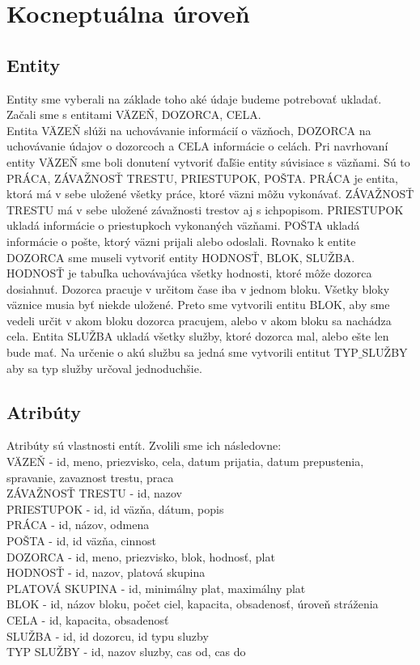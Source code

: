\documentclass[slovak, 12pt, Times New Roman]{article}
\begin{document}
	\section{Kocneptuálna úroveň}
		\subsection{Entity}
			Entity sme vyberali na základe toho aké údaje budeme potrebovať ukladať. Začali sme s entitami VÄZEŇ, DOZORCA, CELA.\\ Entita VÄZEŇ 
			slúži na uchovávanie informácií o väzňoch, DOZORCA na uchovávanie údajov o dozorcoch a CELA informácie o celách. Pri navrhovaní 
			entity VÄZEŇ sme boli donutení vytvoriť ďaľšie entity súvisiace s väzňami. Sú to PRÁCA, ZÁVAŽNOSŤ TRESTU, PRIESTUPOK, POŠTA. PRÁCA 
			je entita, ktorá má v sebe uložené všetky práce, ktoré väzni môžu vykonávať. ZÁVAŽNOSŤ TRESTU má v sebe uložené závažnosti trestov 
			aj s ichpopisom. PRIESTUPOK ukladá informácie o priestupkoch vykonaných väzňami. POŠTA ukladá informácie o pošte, ktorý väzni 
			prijali alebo odoslali. Rovnako k entite DOZORCA sme museli vytvoriť entity HODNOSŤ, BLOK, SLUŽBA. HODNOSŤ je tabuľka uchovávajúca 
			všetky hodnosti, ktoré môže dozorca dosiahnuť. Dozorca pracuje v určitom čase iba v jednom bloku. Všetky bloky väznice musia byť 
			niekde uložené. Preto sme vytvorili entitu BLOK, aby sme vedeli určit v akom bloku dozorca pracujem, alebo v akom bloku sa nachádza 
			cela. Entita SLUŽBA ukladá všetky služby, ktoré dozorca mal, alebo ešte len bude mať. Na určenie o akú službu sa jedná sme 
			vytvorili entitut TYP$\_$SLUŽBY aby sa typ služby určoval jednoduchšie.
		\subsection{Atribúty}
			Atribúty sú vlastnosti entít. Zvolili sme ich následovne: \\
			VÄZEŇ - id, meno, priezvisko, cela, datum prijatia, datum prepustenia, spravanie, zavaznost trestu, praca\\
			ZÁVAŽNOSŤ TRESTU - id, nazov\\
			PRIESTUPOK - id, id väzňa, dátum, popis\\
			PRÁCA - id, názov, odmena\\
			POŠTA - id, id väzňa, cinnost\\
			DOZORCA - id, meno, priezvisko, blok, hodnosť, plat \\
			HODNOSŤ - id, nazov, platová skupina\\
			PLATOVÁ SKUPINA - id, minimálny plat, maximálny plat\\
			BLOK - id, názov bloku, počet ciel, kapacita, obsadenosť, úroveň stráženia\\
			CELA - id, kapacita, obsadenosť\\
			SLUŽBA - id, id dozorcu, id typu sluzby\\
			TYP SLUŽBY - id, nazov sluzby, cas od, cas do\\
\end{document}

